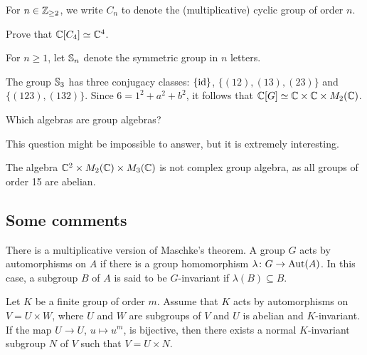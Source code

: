 For $n\in\mathbb{Z}_{\geq2}$, we write $C_n$ to denote the (multiplicative) cyclic group of order $n$. 

\begin{exercise}
    Prove that $\mathbb{C}[C_4]\simeq\mathbb{C}^4$. 
\end{exercise}

For $n\geq1$, let $\mathbb{S}_n$ denote the symmetric group in $n$ letters. 

\begin{example}
\label{exa:S3}
    The group $\mathbb{S}_3$ has three conjugacy classes:
    $\{\operatorname{id}\}$, $\{(12),(13),(23)\}$ and $\{(123),(132)\}$. 
    Since $6=1^2+a^2+b^2$, it follows that 
    $\mathbb{C}[G]\simeq\mathbb{C}\times\mathbb{C}\times M_2(\mathbb{C})$. 
\end{example}    

\begin{problem}[Brauer]
    Which algebras are group algebras?
\end{problem}

This question might be impossible to answer, but it is extremely interesting.

\begin{example}
    The algebra $\mathbb{C}^2\times M_2(\mathbb{C})\times M_3(\mathbb{C})$ is not complex group algebra, as all groups of order 15 are abelian. 
\end{example}

\subsection{Some comments}

There is a multiplicative version of Maschke's theorem. A group $G$ acts 
by automorphisms on $A$ if there is a group homomorphism 
$\lambda\colon G\to\operatorname{Aut}(A)$. In this case, a subgroup $B$ of $A$ is said to be 
$G$-invariant if $\lambda(B)\subseteq B$. 

\begin{theorem}
    Let $K$ be a finite group of order $m$. Assume that 
    $K$ acts by automorphisms on $V=U\times W$, where
    $U$ and $W$ are subgroups of $V$ and $U$ is abelian and $K$-invariant. 
    If the map $U\to U$, $u\mapsto u^m$, is bijective, 
    then there exists a normal $K$-invariant subgroup $N$ of $V$ 
    such that $V=U\times N$. 
\end{theorem}

